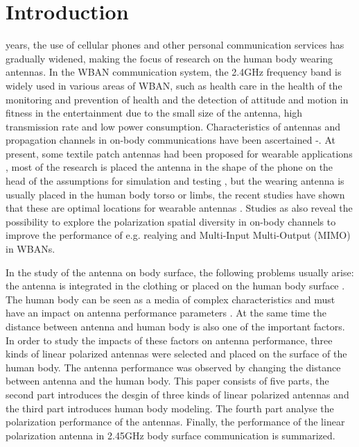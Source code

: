 \documentclass[journal]{IEEEtran}
\begin{document}
\section{Introduction}
 years, the use of cellular phones and other personal communication services has gradually widened, making the focus of research on the human body wearing antennas. In the WBAN communication system, the 2.4GHz frequency band is widely used in various areas of WBAN, such as health care in the health of the monitoring and prevention of health and the detection of attitude and motion in fitness in the entertainment due to the small size of the antenna, high transmission rate and low power consumption. Characteristics of antennas and propagation channels in on-body communications have been ascertained \cite{1}-\cite{4}. At present, some textile patch antennas had been proposed for wearable applications \cite{5}, most of the research is placed the antenna in the shape of the phone on the head of the assumptions for simulation and testing \cite{6, 7}, but the wearing antenna is usually placed in the human body torso or limbs, the recent studies have shown that these are optimal locations for wearable antennas \cite{8}. Studies as \cite{9, 10} also reveal the possibility to explore the polarization spatial diversity in on-body channels to improve the performance of e.g. realying and Multi-Input Multi-Output (MIMO) in WBANs.

In the study of the antenna on body surface, the following problems usually arise: the antenna is integrated in the clothing or placed on the human body surface \cite{11, 12}. The human body can be seen as a media of complex characteristics and must have an impact on antenna performance parameters \cite{13, 14}. At the same time the distance between antenna and human body is also one of the important factors. In order to study the impacts of these factors on antenna performance, three kinds of linear polarized antennas were selected and placed on the surface of the human body. The antenna performance was observed by changing the distance between antenna and the human body. This paper consists of five parts, the second part introduces the desgin of three kinds of
linear polarized antennas and the third part introduces human body modeling. The fourth part analyse the polarization performance of the antennas. Finally, the performance of the linear polarization antenna in 2.45GHz body surface communication is summarized.
\end{document}
